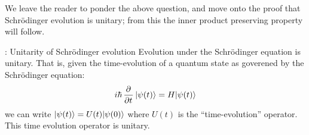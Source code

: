 We leave the reader to ponder the above question, and move onto the proof that Schr\"{o}dinger evolution is unitary; from this the inner product preserving property will follow.

\begin{thmbox}{: Unitarity of Schr\"{o}dinger evolution}\label{thm-SEunitary}
    Evolution under the Schr\"{o}dinger equation is unitary. That is, given the time-evolution of a quantum state as goverened by the Schr\"{o}dinger equation:
    \begin{equation}
        i\hbar\dpd{}{t}\ket{\psi(t)} = H\ket{\psi(t)}
    \end{equation}
    we can write $\lvert \psi(t) \rangle = U(t)\lvert \psi(0) \rangle$ where $U(t)$ is the ``time-evolution'' operator. This time evolution operator is unitary.
\end{thmbox}
